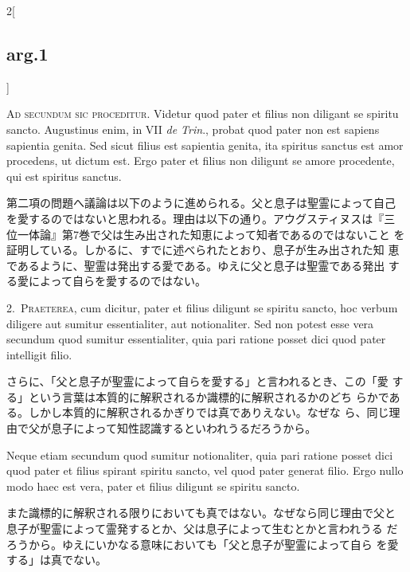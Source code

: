 \documentclass[paper=a4paper,fontsize=10pt,jafontsize=9pt,titlepage]{jlreq}
\begin{document}
\begin{paracol}{2}[\subsection{arg.1}]

{\scshape Ad secundum sic proceditur}. Videtur quod pater et filius
 non diligant se spiritu sancto. Augustinus enim, in VII {\itshape de
 Trin}., probat quod pater non est sapiens sapientia genita. Sed sicut
 filius est sapientia genita, ita spiritus sanctus est amor procedens,
 ut dictum est. Ergo pater et filius non diligunt se amore procedente,
 qui est spiritus sanctus.

\switchcolumn

第二項の問題へ議論は以下のように進められる。父と息子は聖霊によって自己
を愛するのではないと思われる。理由は以下の通り。アウグスティヌスは『三
位一体論』第7巻で父は生み出された知恵によって知者であるのではないこと
を証明している。しかるに、すでに述べられたとおり、息子が生み出された知
恵であるように、聖霊は発出する愛である。ゆえに父と息子は聖霊である発出
する愛によって自らを愛するのではない。


2.~{\scshape Praeterea}, cum dicitur, pater et filius diligunt se
 spiritu sancto, hoc verbum diligere aut sumitur essentialiter, aut
 notionaliter. Sed non potest esse vera secundum quod sumitur
 essentialiter, quia pari ratione posset dici quod pater intelligit
 filio.

\switchcolumn

さらに、「父と息子が聖霊によって自らを愛する」と言われるとき、この「愛
 する」という言葉は本質的に解釈されるか識標的に解釈されるかのどち
 らかである。しかし本質的に解釈されるかぎりでは真でありえない。なぜな
 ら、同じ理由で父が息子によって知性認識するといわれうるだろうから。

\switchcolumn*

Neque etiam secundum quod sumitur notionaliter, quia pari
 ratione posset dici quod pater et filius spirant spiritu sancto, vel
 quod pater generat filio. Ergo nullo modo haec est vera, pater et
 filius diligunt se spiritu sancto.

\switchcolumn

また識標的に解釈される限りにおいても真ではない。なぜなら同じ理由で父と
 息子が聖霊によって霊発するとか、父は息子によって生むとかと言われうる
 だろうから。ゆえにいかなる意味においても「父と息子が聖霊によって自ら
 を愛する」は真でない。


\end{paracol}
\end{document}
